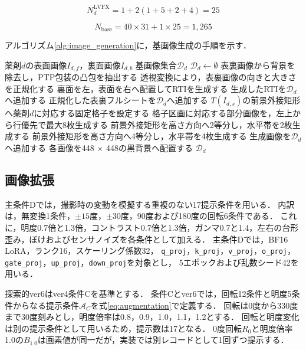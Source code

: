 \documentclass[uplatex,dvipdfmx]{jsarticle}
\begin{document}
\begin{equation}
  N^{\mathrm{LVFX}}_d = 1 + 2(1 + 5 + 2 + 4) = 25
  \label{eq:base_count_lvfx}
\end{equation}

\begin{equation}
  N_{\mathrm{base}} = 40 \times 31 + 1 \times 25 = 1{,}265
  \label{eq:base_total}
\end{equation}

アルゴリズム\ref{alg:image_generation}に，基画像生成の手順を示す．

\begin{algorithm}[H]
  \caption{収集画像からの基画像生成}
  \label{alg:image_generation}
    \begin{algorithmic}[1]
    \REQUIRE 薬剤$d$の表面画像$I_{d,f}$，裏面画像$I_{d,b}$
    \ENSURE 基画像集合$\mathcal{D}_d$
    \STATE $\mathcal{D}_d \gets \emptyset$
    \STATE 表裏画像から背景を除去し，PTP包装の凸包を抽出する
    \STATE 透視変換により，表裏画像の向きと大きさを正規化する
    \STATE 裏面を左，表面を右へ配置してRTIを生成する
    \STATE 生成したRTIを$\mathcal{D}_d$へ追加する
    \STATE 正規化した表裏フルシートを$\mathcal{D}_d$へ追加する
      \STATE $T(I_{d,s})$の前景外接矩形へ薬剤$d$に対応する固定格子を設定する
      \STATE 格子区画に対応する部分画像を，左上から行優先で最大8枚生成する
      \STATE 前景外接矩形を高さ方向へ2等分し，水平帯を2枚生成する
      \STATE 前景外接矩形を高さ方向へ4等分し，水平帯を4枚生成する
      \STATE 生成画像を$\mathcal{D}_d$へ追加する
    \ENDFOR
    \STATE 各画像を448 $\times$ 448の黒背景へ配置する
    \RETURN $\mathcal{D}_d$
  \end{algorithmic}
\end{algorithm}

\subsection{画像拡張}

主条件Dでは，撮影時の変動を模擬する重複のない17提示条件を用いる．
内訳は，無変換1条件，$\pm15$度，$\pm30$度，90度および180度の回転6条件である．
これに，明度0.7倍と1.3倍，コントラスト0.7倍と1.3倍，ガンマ0.7と1.4，左右の台形歪み，ぼけおよびセンサノイズを各条件として加える．
主条件Dでは，BF16 LoRA，ランク16，スケーリング係数32，
\texttt{q\_proj}，\texttt{k\_proj}，\texttt{v\_proj}，\texttt{o\_proj}，
\texttt{gate\_proj}，\texttt{up\_proj}，\texttt{down\_proj}を対象とし，
5エポックおよび乱数シード42を用いる．

探索的ver6はver4条件Cを基準とする．
条件Cとver6では，回転12条件と明度5条件からなる提示条件$\mathcal{A}_C$を式\eqref{eq:augmentation}で定義する．
回転は0度から330度まで30度刻みとし，明度倍率は0.8，0.9，1.0，1.1，1.2とする．
回転と明度変化は別の提示条件として用いるため，提示数は17となる．
0度回転$R_0$と明度倍率1.0の$B_{1.0}$は画素値が同一だが，実装では別レコードとして1回ずつ提示する．
\end{document}
